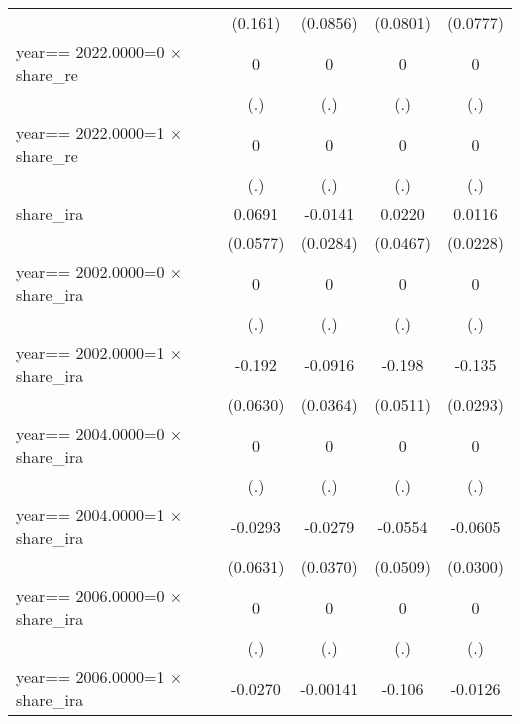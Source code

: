 \begin{table}[htbp]
\begin{tabular}{l*{4}{c}}
                &  (0.161)         & (0.0856)         & (0.0801)         & (0.0777)         \\
\addlinespace
year==  2022.0000=0 $\times$ share\_re&        0         &        0         &        0         &        0         \\
                &      (.)         &      (.)         &      (.)         &      (.)         \\
\addlinespace
year==  2022.0000=1 $\times$ share\_re&        0         &        0         &        0         &        0         \\
                &      (.)         &      (.)         &      (.)         &      (.)         \\
\addlinespace
share\_ira       &   0.0691         &  -0.0141         &   0.0220         &   0.0116         \\
                & (0.0577)         & (0.0284)         & (0.0467)         & (0.0228)         \\
\addlinespace
year==  2002.0000=0 $\times$ share\_ira&        0         &        0         &        0         &        0         \\
                &      (.)         &      (.)         &      (.)         &      (.)         \\
\addlinespace
year==  2002.0000=1 $\times$ share\_ira&   -0.192\sym{***}&  -0.0916\sym{**} &   -0.198\sym{***}&   -0.135\sym{***}\\
                & (0.0630)         & (0.0364)         & (0.0511)         & (0.0293)         \\
\addlinespace
year==  2004.0000=0 $\times$ share\_ira&        0         &        0         &        0         &        0         \\
                &      (.)         &      (.)         &      (.)         &      (.)         \\
\addlinespace
year==  2004.0000=1 $\times$ share\_ira&  -0.0293         &  -0.0279         &  -0.0554         &  -0.0605\sym{**} \\
                & (0.0631)         & (0.0370)         & (0.0509)         & (0.0300)         \\
\addlinespace
year==  2006.0000=0 $\times$ share\_ira&        0         &        0         &        0         &        0         \\
                &      (.)         &      (.)         &      (.)         &      (.)         \\
\addlinespace
year==  2006.0000=1 $\times$ share\_ira&  -0.0270         & -0.00141         &   -0.106\sym{**} &  -0.0126         \\

\end{tabular}
\end{table}
